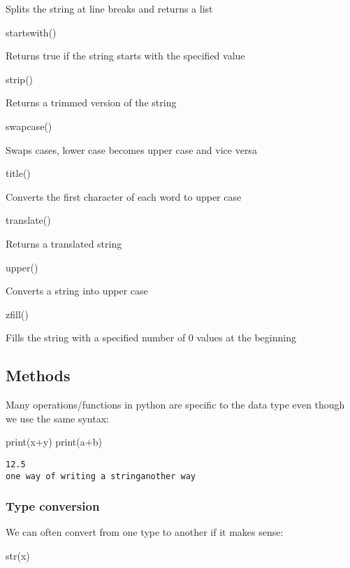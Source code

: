 \documentclass[
  letterpaper,
  DIV=11,
  numbers=noendperiod]{scrreprt}
\newenvironment{Shaded}{\begin{snugshade}}{\end{snugshade}}
\newcommand{\BuiltInTok}[1]{\textcolor[rgb]{0.00,0.23,0.31}{#1}}
\newcommand{\NormalTok}[1]{\textcolor[rgb]{0.00,0.23,0.31}{#1}}
\newcommand{\OperatorTok}[1]{\textcolor[rgb]{0.37,0.37,0.37}{#1}}
\begin{document}
Splits the string at line breaks and returns a list

startswith()

Returns true if the string starts with the specified value

strip()

Returns a trimmed version of the string

swapcase()

Swaps cases, lower case becomes upper case and vice versa

title()

Converts the first character of each word to upper case

translate()

Returns a translated string

upper()

Converts a string into upper case

zfill()

Fills the string with a specified number of 0 values at the beginning

\hypertarget{methods}{%
\subsection{Methods}\label{methods}}

Many operations/functions in python are specific to the data type even
though we use the same syntax:

\begin{Shaded}
\begin{Highlighting}[]
\BuiltInTok{print}\NormalTok{(x}\OperatorTok{+}\NormalTok{y)}
\BuiltInTok{print}\NormalTok{(a}\OperatorTok{+}\NormalTok{b)}
\end{Highlighting}
\end{Shaded}

\begin{verbatim}
12.5
one way of writing a stringanother way
\end{verbatim}

\hypertarget{type-conversion}{%
\subsubsection{Type conversion}\label{type-conversion}}

We can often convert from one type to another if it makes sense:

\begin{Shaded}
\begin{Highlighting}[]
\BuiltInTok{str}\NormalTok{(x)}
\end{Highlighting}
\end{Shaded}
\end{document}
